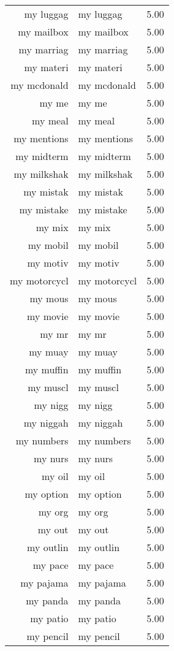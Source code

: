 \begin{table}[ht]
\begin{tabular}{rlr}
  my luggag & my luggag & 5.00 \\ 
  my mailbox & my mailbox & 5.00 \\ 
  my marriag & my marriag & 5.00 \\ 
  my materi & my materi & 5.00 \\ 
  my mcdonald & my mcdonald & 5.00 \\ 
  my me & my me & 5.00 \\ 
  my meal & my meal & 5.00 \\ 
  my mentions & my mentions & 5.00 \\ 
  my midterm & my midterm & 5.00 \\ 
  my milkshak & my milkshak & 5.00 \\ 
  my mistak & my mistak & 5.00 \\ 
  my mistake & my mistake & 5.00 \\ 
  my mix & my mix & 5.00 \\ 
  my mobil & my mobil & 5.00 \\ 
  my motiv & my motiv & 5.00 \\ 
  my motorcycl & my motorcycl & 5.00 \\ 
  my mous & my mous & 5.00 \\ 
  my movie & my movie & 5.00 \\ 
  my mr & my mr & 5.00 \\ 
  my muay & my muay & 5.00 \\ 
  my muffin & my muffin & 5.00 \\ 
  my muscl & my muscl & 5.00 \\ 
  my nigg & my nigg & 5.00 \\ 
  my niggah & my niggah & 5.00 \\ 
  my numbers & my numbers & 5.00 \\ 
  my nurs & my nurs & 5.00 \\ 
  my oil & my oil & 5.00 \\ 
  my option & my option & 5.00 \\ 
  my org & my org & 5.00 \\ 
  my out & my out & 5.00 \\ 
  my outlin & my outlin & 5.00 \\ 
  my pace & my pace & 5.00 \\ 
  my pajama & my pajama & 5.00 \\ 
  my panda & my panda & 5.00 \\ 
  my patio & my patio & 5.00 \\ 
  my pencil & my pencil & 5.00 \\ 

\end{tabular}
\end{table}
